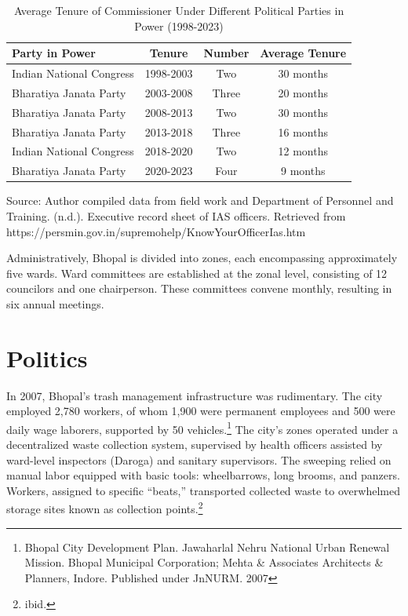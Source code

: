 \begin{table}[ht]
\centering
\caption{Average Tenure of Commissioner Under Different Political Parties in Power (1998-2023)}
\label{tab:bhopal_commissioners}
\begin{tabular}{|l|c|c|c|}
\hline
\textbf{Party in Power} & \textbf{Tenure} & \textbf{Number} & \textbf{Average Tenure} \\
\hline
Indian National Congress & 1998-2003 & Two & 30 months \\
\hline
Bharatiya Janata Party & 2003-2008 & Three & 20 months \\
\hline
Bharatiya Janata Party & 2008-2013 & Two & 30 months \\
\hline
Bharatiya Janata Party & 2013-2018 & Three & 16 months \\
\hline
Indian National Congress & 2018-2020 & Two & 12 months \\
\hline
Bharatiya Janata Party & 2020-2023 & Four & 9 months \\
\hline
\end{tabular}
\raggedright
\small Source: Author compiled data from field work and Department of Personnel and Training. (n.d.). Executive record sheet of IAS officers. Retrieved from https://persmin.gov.in/supremohelp/KnowYourOfficerIas.htm
\end{table}

Administratively, Bhopal is divided into zones, each encompassing approximately five wards. Ward committees are established at the zonal level, consisting of 12 councilors and one chairperson. These committees convene monthly, resulting in six annual meetings.

\section{Politics}

In 2007, Bhopal's trash management infrastructure was rudimentary. The city employed 2,780 workers, of whom 1,900 were permanent employees and 500 were daily wage laborers, supported by 50 vehicles.\footnote{Bhopal City Development Plan. Jawaharlal Nehru National Urban Renewal Mission. Bhopal Municipal Corporation; Mehta \& Associates Architects \& Planners, Indore. Published under JnNURM. 2007} The city's zones operated under a decentralized waste collection system, supervised by health officers assisted by ward-level inspectors (Daroga) and sanitary supervisors. The sweeping relied on manual labor equipped with basic tools: wheelbarrows, long brooms, and panzers. Workers, assigned to specific ``beats,'' transported collected waste to overwhelmed storage sites known as collection points.\footnote{ibid.}

